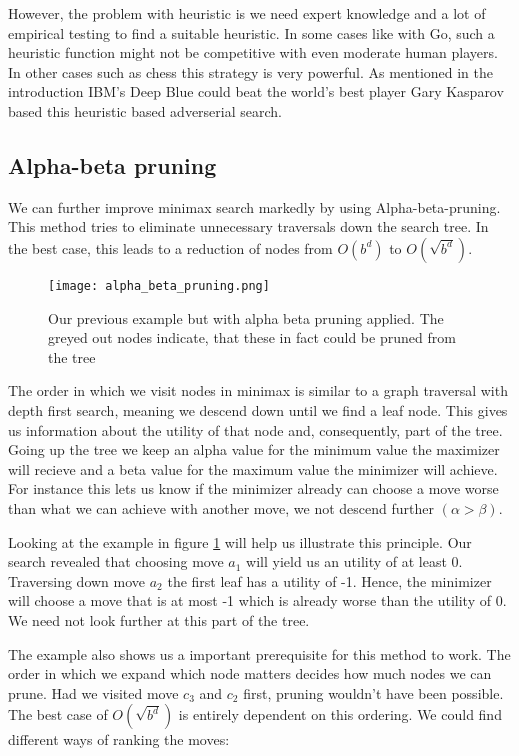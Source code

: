 However, the problem with heuristic is we need expert knowledge and a lot of empirical testing to find a suitable heuristic. In some cases like with Go, such a heuristic function might not be competitive with even moderate human players. In other cases such as chess this strategy is very powerful. As mentioned in the introduction IBM's Deep Blue could beat the world's best player Gary Kasparov based this heuristic based adverserial search.

\subsection{Alpha-beta pruning}
We can further improve minimax search markedly by using Alpha-beta-pruning. This method tries to eliminate unnecessary traversals down the search tree. In the best case, this leads to a reduction of nodes from $ O(b^d) $ to $ O(\sqrt{b^d}) $.

\begin{figure}
    \centering
    \texttt{[image: alpha\_beta\_pruning.png]}
    \caption{Our previous example but with alpha beta pruning applied. The greyed out nodes indicate, that these in fact could be pruned from the tree}
    \label{alpha_beta_pruning}
\end{figure}

The order in which we visit nodes in minimax is similar to a graph traversal with depth first search, meaning we descend down until we find a leaf node. This gives us information about the utility of that node and, consequently, part of the tree. Going up the tree we keep an alpha value for the minimum value the maximizer will recieve and a beta value for the maximum value the minimizer will achieve. For instance this lets us know if the minimizer already can choose a move worse than what we can achieve with another move, we not descend further $ (\alpha > \beta) $.

Looking at the example in figure \ref{alpha_beta_pruning} will help us illustrate this principle. Our search revealed that choosing move $ a_1 $ will yield us an utility of at least 0. Traversing down move $ a_2 $ the first leaf has a utility of -1. Hence, the minimizer will choose a move that is at most -1 which is already worse than the utility of 0. We need not look further at this part of the tree.

The example also shows us a important prerequisite for this method to work. The order in which we expand which node matters decides how much nodes we can prune. Had we visited move $ c_3 $ and $ c_2 $ first, pruning wouldn't have been possible. The best case of $ O(\sqrt{b^d}) $ is entirely dependent on this ordering. We could find different ways of ranking the moves:


